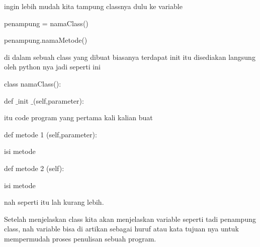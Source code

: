 \vspace{14pt}
\noindent 
{\fontsize{14pt}{14pt}\selectfont ingin lebih mudah kita tampung classnya dulu ke variable  \\} \par
\vspace{14pt}
\noindent 
{\fontsize{14pt}{14pt}\selectfont penampung = namaClass() \\} \par
\noindent 
{\fontsize{14pt}{14pt}\selectfont penampung.namaMetode() \\} \par
\vspace{14pt}
\noindent 
{\fontsize{14pt}{14pt}\selectfont di dalam sebuah class yang dibuat biasanya terdapat init itu disediakan langsung oleh python nya jadi seperti ini \\} \par
\vspace{14pt}
\noindent 
{\fontsize{14pt}{14pt}\selectfont class namaClass(): \\} \par
\noindent 
{\fontsize{14pt}{14pt}\selectfont def $  \_  $init $  \_  $(self,parameter): \\} \par
\noindent 
{\fontsize{14pt}{14pt}\selectfont itu code program yang pertama kali kalian buat \\} \par
\noindent 
{\fontsize{14pt}{14pt}\selectfont def metode 1 (self,parameter): \\} \par
\noindent 
{\fontsize{14pt}{14pt}\selectfont isi metode \\} \par
\noindent 
{\fontsize{14pt}{14pt}\selectfont def metode 2 (self): \\} \par
\noindent 
{\fontsize{14pt}{14pt}\selectfont isi metode \\} \par
\noindent 
{\fontsize{14pt}{14pt}\selectfont nah seperti itu lah kurang lebih. \\} \par
\vspace{14pt}
\noindent 
{\fontsize{14pt}{14pt}\selectfont Setelah menjelaskan class kita akan menjelaskan variable seperti tadi penampung class, nah variable bisa di artikan sebagai huruf atau kata tujuan nya untuk mempermudah proses penulisan sebuah program. \\} \par
